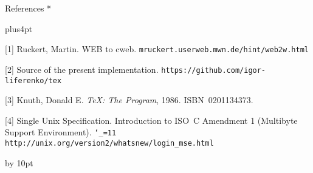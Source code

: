 \head * References *

\begingroup
\vskip-1pt

\frenchspacing
\parindent=0pt
\parskip=4pt plus4pt
\def\\{\hfil\break}
\everypar{\hangindent=1.5em\relax}
\raggedright

[1] Ruckert, Martin. WEB to cweb.\\
{\tt mruckert.userweb.mwn.de/hint/web2w.html}

[2] Source of the present implementation.\\
{\tt https://github.com/igor-liferenko/tex}

[3] Knuth, Donald E. {\sl \TeX: The Program\/}, 1986. ISBN~0201134373.

[4] Single Unix Specification. Introduction to ISO~C Amendment 1
(Multibyte Support Environment).\\
{\tt\catcode`_=11 http://unix.org/version2/whatsnew/\\login_mse.html}

\par\endgroup

\advance\signaturewidth by 10pt
\makesignature
\endarticle
